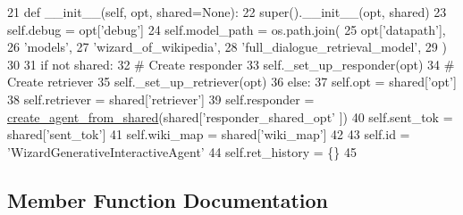 \begin{DoxyCode}
21     \textcolor{keyword}{def }\_\_init\_\_(self, opt, shared=None):
22         super().\_\_init\_\_(opt, shared)
23         self.debug = opt[\textcolor{stringliteral}{'debug'}]
24         self.model\_path = os.path.join(
25             opt[\textcolor{stringliteral}{'datapath'}],
26             \textcolor{stringliteral}{'models'},
27             \textcolor{stringliteral}{'wizard\_of\_wikipedia'},
28             \textcolor{stringliteral}{'full\_dialogue\_retrieval\_model'},
29         )
30 
31         \textcolor{keywordflow}{if} \textcolor{keywordflow}{not} shared:
32             \textcolor{comment}{# Create responder}
33             self.\_set\_up\_responder(opt)
34             \textcolor{comment}{# Create retriever}
35             self.\_set\_up\_retriever(opt)
36         \textcolor{keywordflow}{else}:
37             self.opt = shared[\textcolor{stringliteral}{'opt'}]
38             self.retriever = shared[\textcolor{stringliteral}{'retriever'}]
39             self.responder = \hyperlink{namespaceparlai_1_1core_1_1agents_aa5af5dd1d2f9da491b60348d479b849f}{create\_agent\_from\_shared}(shared[\textcolor{stringliteral}{'responder\_shared\_opt'}
      ])
40             self.sent\_tok = shared[\textcolor{stringliteral}{'sent\_tok'}]
41             self.wiki\_map = shared[\textcolor{stringliteral}{'wiki\_map'}]
42 
43         self.id = \textcolor{stringliteral}{'WizardGenerativeInteractiveAgent'}
44         self.ret\_history = \{\}
45 
\end{DoxyCode}


\subsection{Member Function Documentation}
\mbox{\label{classprojects_1_1wizard__of__wikipedia_1_1interactive__end2end_1_1interactive__end2end_1_1InteractiveEnd2endAgent_af8e3d5c519f65f9706715b4e8b5a3d98}} 
